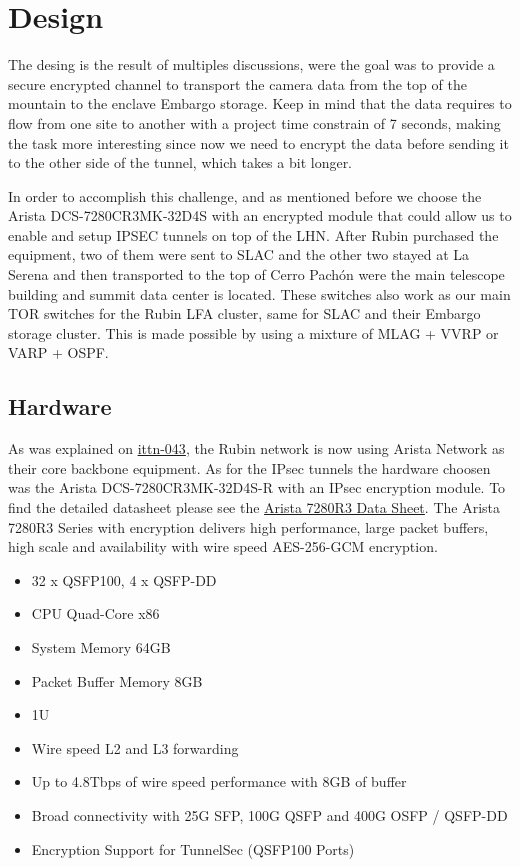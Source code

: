 \section{Design}
The desing is the result of multiples discussions, were the goal was to provide a secure encrypted channel to transport the camera data from the top of the mountain to the enclave Embargo storage. Keep in mind that the data requires to flow from one site to another with a project time constrain of 7 seconds, making the task more interesting since now we need to encrypt the data before sending it to the other side of the tunnel, which takes a bit longer. 

In order to accomplish this challenge, and as mentioned before we choose the Arista DCS-7280CR3MK-32D4S with an encrypted module that could allow us to enable and setup IPSEC tunnels on top of the LHN. 
After Rubin purchased the equipment, two of them were sent to SLAC and the other two stayed at La Serena and then transported to the top of Cerro Pachón were the main telescope building and summit data center is located. These switches also work as our main TOR switches for the Rubin LFA cluster, same for SLAC and their Embargo storage cluster. This is made possible by using a mixture of MLAG + VVRP or VARP + OSPF.

\subsection{Hardware}
As was explained on \href{https://ittn-043.lsst.io/}{ittn-043}, the Rubin network is now using Arista Network as their core backbone equipment. As for the IPsec tunnels the hardware choosen was the Arista DCS-7280CR3MK-32D4S-R with an IPsec encryption module. 
To find the detailed datasheet please see the \href{https://www.arista.com/assets/data/pdf/Datasheets/7280R3-Data-Sheet.pdf}{Arista 7280R3 Data Sheet}.
The Arista 7280R3 Series with encryption delivers high performance, large packet buffers, high scale and availability with wire speed
AES-256-GCM encryption. 

\begin{itemize}
\item 32 x QSFP100, 4 x QSFP-DD
\item CPU Quad-Core x86
\item System Memory 64GB
\item Packet Buffer Memory 8GB
\item 1U
\item Wire speed L2 and L3 forwarding
\item Up to 4.8Tbps of wire speed performance with 8GB of buffer
\item Broad connectivity with 25G SFP, 100G QSFP and 400G OSFP / QSFP-DD
\item Encryption Support for TunnelSec (QSFP100 Ports)
\end{itemize}

